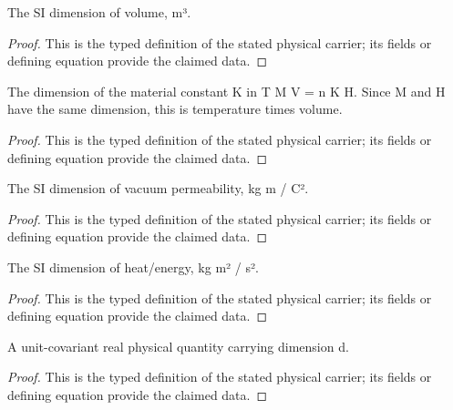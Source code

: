 \begin{definition}
  \label{def:physics:IPhO_2026_3_C_2:aux002}
  The SI dimension of volume, m³.
\end{definition}
\begin{proof}
  This is the typed definition of the stated physical carrier; its fields or defining equation provide the claimed data.
\end{proof}

\begin{definition}
  \label{def:physics:IPhO_2026_3_C_2:aux003}
  The dimension of the material constant K in T M V = n K H. Since M and H have the same dimension, this is temperature times volume.
\end{definition}
\begin{proof}
  This is the typed definition of the stated physical carrier; its fields or defining equation provide the claimed data.
\end{proof}

\begin{definition}
  \label{def:physics:IPhO_2026_3_C_2:aux004}
  The SI dimension of vacuum permeability, kg m / C².
\end{definition}
\begin{proof}
  This is the typed definition of the stated physical carrier; its fields or defining equation provide the claimed data.
\end{proof}

\begin{definition}
  \label{def:physics:IPhO_2026_3_C_2:aux005}
  The SI dimension of heat/energy, kg m² / s².
\end{definition}
\begin{proof}
  This is the typed definition of the stated physical carrier; its fields or defining equation provide the claimed data.
\end{proof}

\begin{definition}
  \label{def:physics:IPhO_2026_3_C_2:aux006}
  A unit-covariant real physical quantity carrying dimension d.
\end{definition}
\begin{proof}
  This is the typed definition of the stated physical carrier; its fields or defining equation provide the claimed data.
\end{proof}


